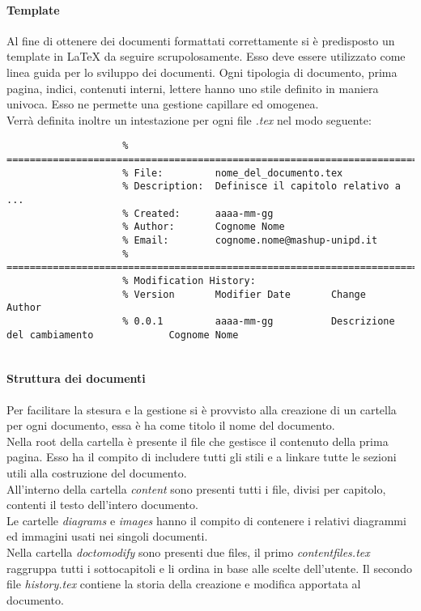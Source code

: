 			\paragraph{Template}
			Al fine di ottenere dei documenti formattati correttamente si è predisposto un template in \LaTeX{} da seguire scrupolosamente. Esso deve essere utilizzato come linea guida per lo sviluppo dei documenti. Ogni tipologia di documento, prima pagina, indici, contenuti interni, lettere hanno uno stile definito in maniera univoca. Esso ne permette una gestione capillare ed omogenea.\\
			Verrà definita inoltre un intestazione per ogni file \emph{.tex} nel modo seguente:
				\begin{verbatim}
					% ==================================================================================
					% File:			nome_del_documento.tex
					% Description:	Definisce il capitolo relativo a ...
					% Created:		aaaa-mm-gg
					% Author:		Cognome Nome
					% Email:		cognome.nome@mashup-unipd.it
					% ===================================================================================
					% Modification History:
					% Version		Modifier Date		Change									Author
					% 0.0.1 		aaaa-mm-gg 			Descrizione del cambiamento				Cognome Nome
					
				\end{verbatim}
			\noindent

			\paragraph{Struttura dei documenti}
			Per facilitare la stesura e la gestione si è provvisto alla creazione di un cartella per ogni documento, essa è ha come titolo il nome del documento.\\
			Nella root della cartella è presente il file che gestisce il contenuto della prima pagina. Esso ha il compito di includere tutti gli stili e a linkare tutte le sezioni utili alla costruzione del documento.\\
			All'interno della cartella \emph{content} sono presenti tutti i file, divisi per capitolo, contenti il testo dell'intero documento.\\
			Le cartelle \emph{diagrams} e \emph{images} hanno il compito di contenere i relativi diagrammi ed immagini usati nei singoli documenti.\\
			Nella cartella \emph{doc\textunderscore to\textunderscore modify} sono presenti due files, il primo \emph{content\textunderscore files.tex} raggruppa tutti i sottocapitoli e li ordina in base alle scelte dell'utente. Il secondo file \emph{history.tex} contiene la storia della creazione e modifica apportata al documento.

